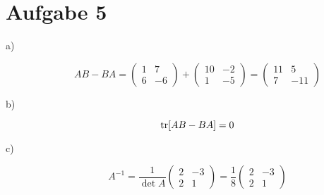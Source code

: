 \section*{Aufgabe 5}
\begin{description}
	\item[a)]
	\[
		AB - BA
		= \begin{pmatrix}
			1 & 7 \\ 6 & -6
		\end{pmatrix} + 
		\begin{pmatrix}
			10 & -2 \\ 1 & -5
		\end{pmatrix}
		= \begin{pmatrix}
			11 & 5 \\ 7 & -11
		\end{pmatrix}
	\] 
	
	\item[b)]
	\[
		\tr[AB - BA] = 0
	\]
	
	\item[c)]
	\[
		A^{-1} = \frac{1}{\det A} \begin{pmatrix}
			2 & -3 \\
			2 & 1
		\end{pmatrix}
		= \frac{1}{8} \begin{pmatrix}
			2 & -3 \\ 2 & 1
		\end{pmatrix}
	\]
\end{description}